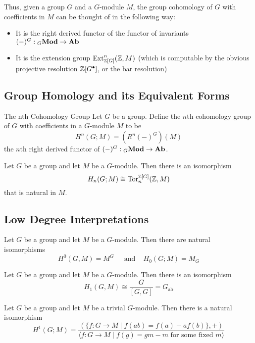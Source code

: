 \documentclass[a4paper]{article}
\begin{document}
Thus, given a group $G$ and a $G$-module $M$, the group cohomology of $G$ with coefficients in $M$ can be thought of in the following way: 
\begin{itemize}
\item It is the right derived functor of the functor of invariants $(-)^G:{_G\bold{Mod}}\to\bold{Ab}$
\item It is the extension group $\text{Ext}_{\mathbb{Z}[G]}^n(\mathbb{Z},M)$ (which is computable by the obvious projective resolution $\mathbb{Z}[G^\bullet]$, or the bar resolution)
\end{itemize}

\subsection{Group Homology and its Equivalent Forms}
\begin{defn}{The nth Cohomology Group}{} Let $G$ be a group. Define the $n$th cohomology group of $G$ with coefficients in a $G$-module $M$ to be $$H^n(G;M)=(R^n(-)^G)(M)$$ the $n$th right derived functor of $(-)^G:{_G\bold{Mod}}\to\bold{Ab}$. 
\end{defn}

\begin{thm}{}{} Let $G$ be a group and let $M$ be a $G$-module. Then there is an isomorphism $$H_n(G;M)\cong\text{Tor}_n^{\mathbb{Z}[G]}(\mathbb{Z},M)$$ that is natural in $M$. 
\end{thm}

\subsection{Low Degree Interpretations}
\begin{thm}{}{} Let $G$ be a group and let $M$ be a $G$-module. Then there are natural isomorphisms $$H^0(G,M)=M^G\;\;\;\;\text{ and }\;\;\;H_0(G;M)=M_G$$
\end{thm}

\begin{thm}{}{} Let $G$ be a group and let $M$ be a $G$-module. Then there is an isomorphism $$H_1(G,M)\cong\frac{G}{[G,G]}=G_\text{ab}$$
\end{thm}

\begin{thm}{}{} Let $G$ be a group and let $M$ be a trivial $G$-module. Then there is a natural isomorphism $$H^1(G;M)=\frac{(\{f:G\to M\;|\;f(ab)=f(a)+af(b)\},+)}{\langle f:G\to M\;|\;f(g)=gm-m\text{ for some fixed }m\rangle}$$
\end{thm}
\end{document}

